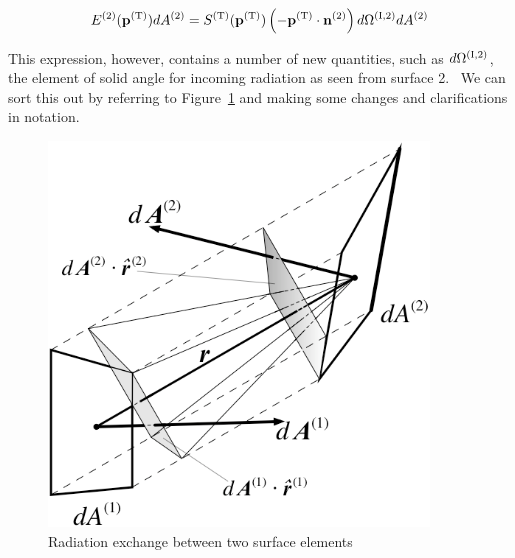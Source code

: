 \begin{equation}
{E^{{\rm{(2)}}}}({{\bf{p}}^{{\rm{(T)}}}})d{A^{{\rm{(2)}}}} = {S^{{\rm{(T)}}}}({{\bf{p}}^{{\rm{(T)}}}})\left( { - {{\bf{p}}^{{\rm{(T)}}}}\cdot {{\bf{n}}^{{\rm{(2)}}}}} \right)d{\Omega ^{{\rm{(I,2)}}}}d{A^{{\rm{(2)}}}}
\label{eq:E2pTdA2Equation1}
\end{equation}

This expression, however, contains a number of new quantities, such as \(d{\Omega ^{{\rm{(I,2)}}}}\), the element of solid angle for incoming radiation as seen from surface 2.~ We can sort this out by referring to Figure~\ref{fig:radiation-exchange-between-two-surface} and making some changes and clarifications in notation.

\begin{figure}[hbtp] %
\centering
\includegraphics[width=0.9\textwidth, height=0.9\textheight, keepaspectratio=true]{media/image1275.png}
\caption{Radiation exchange between two surface elements \protect \label{fig:radiation-exchange-between-two-surface}}
\end{figure}

